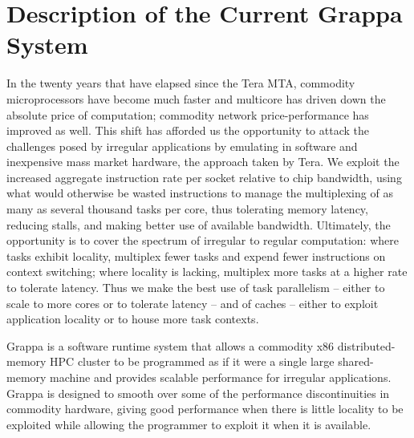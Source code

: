 
\section{Description of the Current Grappa System}

In the twenty years that have elapsed since the Tera MTA, commodity microprocessors have become much faster and multicore has driven down the absolute price of computation; commodity network price-performance has improved as well. This shift has afforded us the opportunity to attack the challenges posed by irregular applications by emulating in software and inexpensive mass market hardware, the approach taken by Tera. We exploit the increased aggregate instruction rate per socket relative to chip bandwidth, using what would otherwise be wasted instructions to manage the multiplexing of as many as several thousand tasks per core, thus tolerating memory latency, reducing stalls, and making better use of available bandwidth. Ultimately, the opportunity is to cover the spectrum of irregular to regular computation: where tasks exhibit locality, multiplex fewer tasks and expend fewer instructions on context switching; where locality is lacking, multiplex more tasks at a higher rate to tolerate latency. Thus we make the best use of task parallelism -- either to scale to more cores or to tolerate latency -- and of caches -- either to exploit application locality or to house more task contexts.

Grappa is a software runtime system that allows a commodity x86 distributed-memory HPC cluster to be programmed as if it were a single large shared-memory machine and provides scalable performance for irregular applications. Grappa is designed to smooth over some of the performance discontinuities in commodity hardware, giving good performance when there is little locality to be exploited while allowing the programmer to exploit it when it is available.

